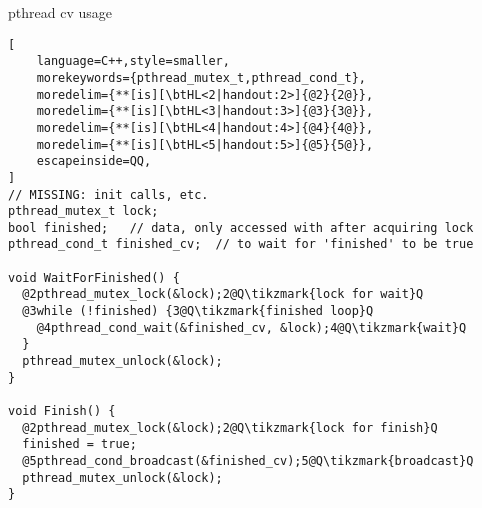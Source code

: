 \begin{frame}[fragile,label=finishedExample]{pthread cv usage}
\begin{lstlisting}[
    language=C++,style=smaller,
    morekeywords={pthread_mutex_t,pthread_cond_t},
    moredelim={**[is][\btHL<2|handout:2>]{@2}{2@}}, 
    moredelim={**[is][\btHL<3|handout:3>]{@3}{3@}}, 
    moredelim={**[is][\btHL<4|handout:4>]{@4}{4@}}, 
    moredelim={**[is][\btHL<5|handout:5>]{@5}{5@}}, 
    escapeinside=QQ,
]
// MISSING: init calls, etc.
pthread_mutex_t lock;
bool finished;   // data, only accessed with after acquiring lock
pthread_cond_t finished_cv;  // to wait for 'finished' to be true

void WaitForFinished() {
  @2pthread_mutex_lock(&lock);2@Q\tikzmark{lock for wait}Q
  @3while (!finished) {3@Q\tikzmark{finished loop}Q
    @4pthread_cond_wait(&finished_cv, &lock);4@Q\tikzmark{wait}Q
  }
  pthread_mutex_unlock(&lock);
}

void Finish() {
  @2pthread_mutex_lock(&lock);2@Q\tikzmark{lock for finish}Q
  finished = true;
  @5pthread_cond_broadcast(&finished_cv);5@Q\tikzmark{broadcast}Q
  pthread_mutex_unlock(&lock);
}
\end{lstlisting}
\end{frame}
